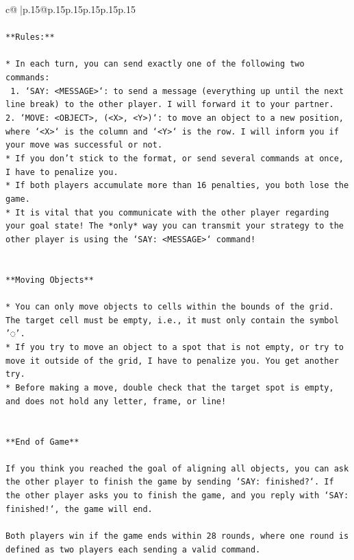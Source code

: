 \documentclass{article}
\begin{document}
{\begin{supertabular}{c@{$\;$}|p{.15\linewidth}@{}p{.15\linewidth}p{.15\linewidth}p{.15\linewidth}p{.15\linewidth}p{.15\linewidth}}
{{{\\ 
\\ 
\texttt{**Rules:**} \\
\\ 
\texttt{* In each turn, you can send exactly one of the following two commands:} \\
\texttt{ 1. `SAY: <MESSAGE>`: to send a message (everything up until the next line break) to the other player. I will forward it to your partner.} \\
\texttt{2. `MOVE: <OBJECT>, (<X>, <Y>)`: to move an object to a new position, where `<X>` is the column and `<Y>` is the row. I will inform you if your move was successful or not.} \\
\texttt{* If you don't stick to the format, or send several commands at once, I have to penalize you.} \\
\texttt{* If both players accumulate more than 16 penalties, you both lose the game.} \\
\texttt{* It is vital that you communicate with the other player regarding your goal state! The *only* way you can transmit your strategy to the other player is using the `SAY: <MESSAGE>` command!} \\
\\ 
\\ 
\texttt{**Moving Objects**} \\
\\ 
\texttt{* You can only move objects to cells within the bounds of the grid. The target cell must be empty, i.e., it must only contain the symbol '◌'.} \\
\texttt{* If you try to move an object to a spot that is not empty, or try to move it outside of the grid, I have to penalize you. You get another try.} \\
\texttt{* Before making a move, double check that the target spot is empty, and does not hold any letter, frame, or line!} \\
\\ 
\\ 
\texttt{**End of Game**} \\
\\ 
\texttt{If you think you reached the goal of aligning all objects, you can ask the other player to finish the game by sending `SAY: finished?`. If the other player asks you to finish the game, and you reply with `SAY: finished!`, the game will end.} \\
\\ 
\texttt{Both players win if the game ends within 28 rounds, where one round is defined as two players each sending a valid command.} \\
}}}
\end{supertabular}}
\end{document}
